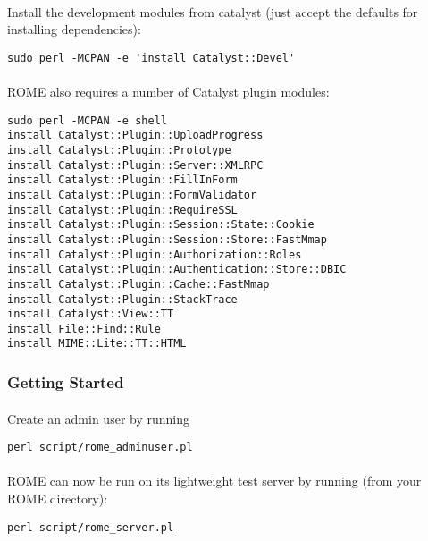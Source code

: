 \paragraph{}
Install the development modules from catalyst (just accept the defaults for installing dependencies):

\begin{verbatim}
sudo perl -MCPAN -e 'install Catalyst::Devel' 
\end{verbatim}

\paragraph{}
ROME also requires a number of Catalyst plugin modules:

\begin{verbatim}
sudo perl -MCPAN -e shell
install Catalyst::Plugin::UploadProgress
install Catalyst::Plugin::Prototype
install Catalyst::Plugin::Server::XMLRPC
install Catalyst::Plugin::FillInForm
install Catalyst::Plugin::FormValidator
install Catalyst::Plugin::RequireSSL
install Catalyst::Plugin::Session::State::Cookie
install Catalyst::Plugin::Session::Store::FastMmap
install Catalyst::Plugin::Authorization::Roles
install Catalyst::Plugin::Authentication::Store::DBIC
install Catalyst::Plugin::Cache::FastMmap
install Catalyst::Plugin::StackTrace
install Catalyst::View::TT
install File::Find::Rule
install MIME::Lite::TT::HTML
\end{verbatim}


\subsubsection{Getting Started}

\paragraph{}
Create an admin user by running

\begin{verbatim}
perl script/rome_adminuser.pl 
\end{verbatim}

\paragraph{}
ROME can now be run on its lightweight test server by running (from your ROME directory):

\begin{verbatim}
perl script/rome_server.pl
\end{verbatim}

